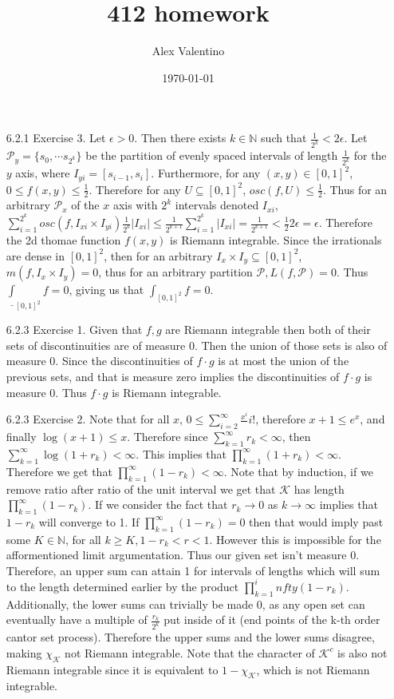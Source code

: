 \documentclass[12pt, letterpaper]{article}
\date{\today}
\author{Alex Valentino}
\title{412 homework}
\newcommand{\N}{\mathbb{N}}
\newcommand{\Po}{\mathcal{P}}
\begin{document}
\begin{enumerate}
	\item[6.2.1] Exercise 3.  Let $\epsilon > 0$.  Then 
	there exists $k \in \N$ such that $\frac{1}{2^k} < 2 \epsilon$.  Let $\Po_y = \{s_0,\cdots s_{2^k}\}$ be the partition of evenly spaced intervals of length $\frac{1}{2^k}$ for the $y$ axis, 
	where $I_{yi} = [s_{i-1},s_i]$.  Furthermore, for any 
	$(x,y) \in [0,1]^2$, $0 \leq f(x,y) \leq \frac{1}{2}$.  Therefore for any $U \subseteq [0,1]^2$,
	$osc(f,U) \leq \frac{1}{2}$.  Thus for an arbitrary 
	$\Po_x$ of the $x$ axis with $2^k$ intervals denoted 
	$I_{xi}$, 
	$\sum_{i=1}^{2^k} osc(f,I_{xi}\times I_{yi}) \frac{1}{2^k}|I_{xi}| \leq \frac{1}{2^{k+1}} \sum_{i=1}^{2^k} |I_{xi}| = 
	\frac{1}{2^{k+1}} < \frac{1}{2}2\epsilon = \epsilon$.  
	Therefore the 2d thomae function $f(x,y)$ is Riemann integrable.
	Since the irrationals are dense in $[0,1]^2$, 
	then for an arbitrary $I_x \times I_y \subseteq [0,1]^2$,
	$m(f,I_x \times I_y) = 0$, thus for an arbitrary partition
	$\Po, L(f,\Po) = 0$.  Thus $\underline{\int}_{[0,1]^2}f = 0$, 
	giving us that $\int_{[0,1]^2} f = 0$.  
	\item[6.2.3] Exercise 1.  Given that $f,g$ are Riemann integrable then both of their sets of discontinuities are of 
	measure 0.  Then the union of those sets is also of measure 0.
	Since the discontinuities of $f\cdot g$ is at most the union 
	of the previous sets, and that is measure zero implies the 
	discontinuities of $f\cdot g$ is measure 0.  Thus $f \cdot g$
	is Riemann integrable.  
	\item[6.2.3] Exercise 2.  Note that for all $x$, $0 \leq 
	\sum_{i=2}^\infty \frac{x^i}{}i!$, therefore $x + 1 \leq e^x$,
	and finally $\log(x+1) \leq x$.  Therefore since $\sum_{k=1}^\infty r_k < \infty$, then $\sum_{k=1}^\infty \log(1+r_k) < \infty$.  This implies that $\prod_{k=1}^\infty (1+r_k) < \infty$.  
	Therefore we get that $\prod_{k=1}^\infty (1-r_k) < \infty$.  
	Note that by induction, if we remove ratio after 
	ratio of the unit interval we get that $\mathcal{K}$ has 
	length $\prod_{k=1}^\infty (1-r_k)$.  If we consider the fact 
	that $r_k \to 0$ as $k \to \infty$ implies that $1-r_k$ will 
	converge to 1.  If $\prod_{k=1}^\infty (1-r_k) = 0$ then 
	that would imply past some $K \in \N$, for all $k \geq K, 
	1 - r_k < r < 1$.  However this is impossible for the 
	afformentioned limit argumentation.  Thus our given set 
	isn't measure 0.  Therefore, an upper sum can attain 1 for 
	intervals of lengths which will sum to the length determined 
	earlier by the product $\prod_{k=1}^infty (1-r_k)$.  Additionally, the lower sums can trivially be made 
	0, as any open set can eventually have a multiple of $\frac{r_k}{2^k}$ put inside of it (end points of the k-th order cantor set process).  Therefore the upper sums and the lower sums disagree, making
	$\chi_\mathcal{K}$ not Riemann integrable.  Note that the character of 
	$\mathcal{K}^c$ is also not Riemann integrable since it is
	equivalent to $1 - \chi_\mathcal{K}$, which is not Riemann 
	integrable.  
	

\end{enumerate}
\end{document}
